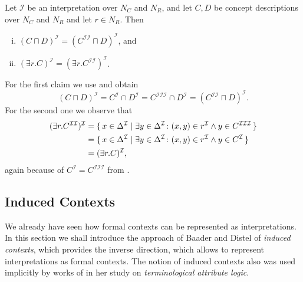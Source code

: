 \begin{Proposition}
  \label{prop:double-II-under-I}
  Let $\mathcal{I}$ be an interpretation over $N_C$ and $N_R$, and let $C, D$ be \ELgfpbot
  concept descriptions over $N_C$ and $N_R$ and let $r \in N_R$.  Then
  \begin{enumerate}[i. ]
  \item $(C \sqcap D)^{\mathcal{I}} = (C^{\mathcal{I}\mathcal{I}} \sqcap
    D)^{\mathcal{I}}$, and
  \item $(\exists r. C)^{\mathcal{I}} = (\exists r. C^{\mathcal{I}\mathcal{I}})^{\mathcal{I}}$.
  \end{enumerate}
\end{Proposition}
\begin{Proof}
  For the first claim we use  and obtain
  \begin{equation*}
    (C \sqcap D)^{\mathcal{I}} = C^{\mathcal{I}} \cap D^{\mathcal{I}} =
    C^{\mathcal{I}\mathcal{I}\mathcal{I}} \cap D^{\mathcal{I}} =
    (C^{\mathcal{I}\mathcal{I}} \sqcap D)^{\mathcal{I}}.
  \end{equation*}
  For the second one we observe that
  \begin{align*}
    (\exists r. C^{\mathcal{I}\mathcal{I}})^{\mathcal{I}}
    &= {\{\, x \in \Delta^{\mathcal{I}} \mid \exists y \in \Delta^{\mathcal{I}} \colon (x, y)
      \in r^{\mathcal{I}} \wedge y \in C^{\mathcal{I}\mathcal{I}\mathcal{I}} \,\}}\\
    &= {\{\, x \in \Delta^{\mathcal{I}} \mid \exists y \in \Delta^{\mathcal{I}} \colon (x, y)
      \in r^{\mathcal{I}} \wedge y \in C^{\mathcal{I}} \,\}} \\
    &= (\exists r. C)^{\mathcal{I}},
  \end{align*}
  again because of $C^{\mathcal{I}} = C^{\mathcal{I}\mathcal{I}\mathcal{I}}$ from
  .
\end{Proof}


\subsection{Induced Contexts}
\label{sec:induced-contexts}

We already have seen how formal contexts can be represented as interpretations.  In this
section we shall introduce the approach of Baader and Distel of \emph{induced contexts},
which provides the inverse direction, \ie which allows to represent interpretations as
formal contexts.  The notion of induced contexts also was used implicitly by works of
\textcite{books/math/Prediger00} in her study on \emph{terminological attribute logic}.

